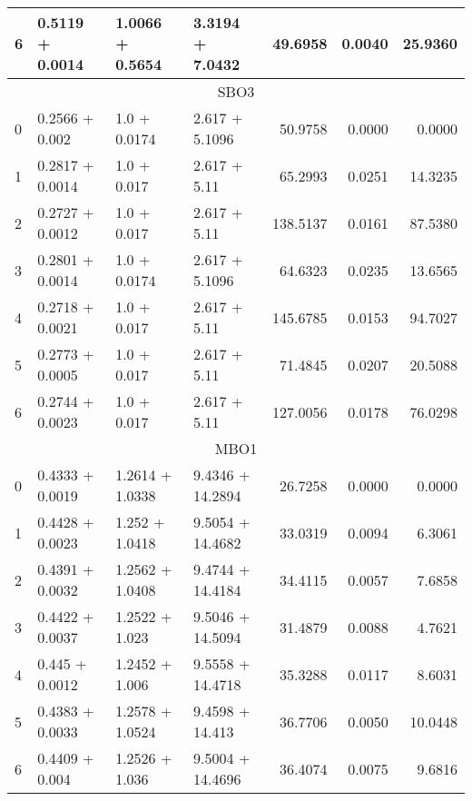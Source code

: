 \begin{tabular}{llllrrr}
  6 &  0.5119 + 0.0014 &  1.0066 + 0.5654 &  3.3194 + 7.0432 &             49.6958 &                 0.0040 &        25.9360 \\
  \midrule
  \multicolumn{7}{c}{SBO3} \\
  \midrule
  0 &   0.2566 + 0.002 &  1.0 + 0.0174 &  2.617 + 5.1096 &             50.9758 &                 0.0000 &         0.0000 \\
  1 &  0.2817 + 0.0014 &   1.0 + 0.017 &    2.617 + 5.11 &             65.2993 &                 0.0251 &        14.3235 \\
  2 &  0.2727 + 0.0012 &   1.0 + 0.017 &    2.617 + 5.11 &            138.5137 &                 0.0161 &        87.5380 \\
  3 &  0.2801 + 0.0014 &  1.0 + 0.0174 &  2.617 + 5.1096 &             64.6323 &                 0.0235 &        13.6565 \\
  4 &  0.2718 + 0.0021 &   1.0 + 0.017 &    2.617 + 5.11 &            145.6785 &                 0.0153 &        94.7027 \\
  5 &  0.2773 + 0.0005 &   1.0 + 0.017 &    2.617 + 5.11 &             71.4845 &                 0.0207 &        20.5088 \\
  6 &  0.2744 + 0.0023 &   1.0 + 0.017 &    2.617 + 5.11 &            127.0056 &                 0.0178 &        76.0298 \\
  \midrule
  \multicolumn{7}{c}{MBO1} \\
  \midrule
  0 &  0.4333 + 0.0019 &  1.2614 + 1.0338 &  9.4346 + 14.2894 &             26.7258 &                 0.0000 &         0.0000 \\
  1 &  0.4428 + 0.0023 &   1.252 + 1.0418 &  9.5054 + 14.4682 &             33.0319 &                 0.0094 &         6.3061 \\
  2 &  0.4391 + 0.0032 &  1.2562 + 1.0408 &  9.4744 + 14.4184 &             34.4115 &                 0.0057 &         7.6858 \\
  3 &  0.4422 + 0.0037 &   1.2522 + 1.023 &  9.5046 + 14.5094 &             31.4879 &                 0.0088 &         4.7621 \\
  4 &   0.445 + 0.0012 &   1.2452 + 1.006 &  9.5558 + 14.4718 &             35.3288 &                 0.0117 &         8.6031 \\
  5 &  0.4383 + 0.0033 &  1.2578 + 1.0524 &   9.4598 + 14.413 &             36.7706 &                 0.0050 &        10.0448 \\
  6 &   0.4409 + 0.004 &   1.2526 + 1.036 &  9.5004 + 14.4696 &             36.4074 &                 0.0075 &         9.6816 \\

\end{tabular}
